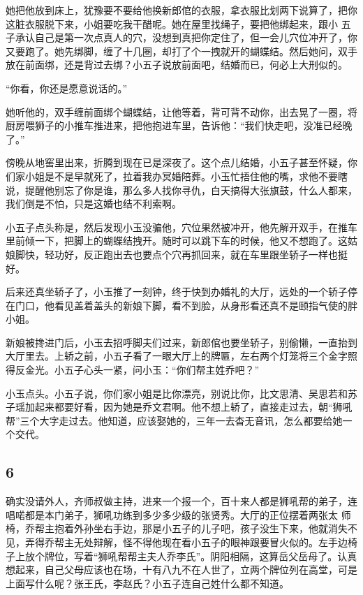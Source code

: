 她把他放到床上，犹豫要不要给他换新郎倌的衣服，拿衣服比划两下说算了，把你这脏衣服脱下来，小姐要吃我干醋呢。她在屋里找绳子，要把他绑起来，跟小
五子承认自己是第一次点真人的穴，没想到真把你定住了，但一会儿穴位冲开了，你又要跑了。她先绑脚，缠了十几圈，却打了个一拽就开的蝴蝶结。然后她问，双手放在前面绑，还是背过去绑？小五子说放前面吧，结婚而已，何必上大刑似的。

“你看，你还是愿意说话的。”

她听他的，双手缠前面绑个蝴蝶结，让他等着，背可背不动你，出去晃了一圈，将厨房喂狮子的小推车推进来，把他抱进车里，告诉他：“我们快走吧，没准已经晚了。”

傍晚从地窖里出来，折腾到现在已是深夜了。这个点儿结婚，小五子甚至怀疑，你们家小姐是不是早就死了，拉着我办冥婚陪葬。小玉忙捂住他的嘴，求他不要瞎说，提醒他别忘了你是谁，那么多人找你寻仇，白天搞得大张旗鼓，什么人都来，我们倒是不怕，只是这婚也结不利索啊。

小五子点头称是，然后发现小玉没骗他，穴位果然被冲开，他先解开双手，在推车里前倾一下，把脚上的蝴蝶结拽开。随时可以跳下车的时候，他又不想跑了。这姑娘脚快，轻功好，反正跑出去也要点个穴再抓回来，就在车里跟坐轿子一样也挺好。

后来还真坐轿子了，小玉推了一刻钟，终于快到办婚礼的大厅，远处的一个轿子停在门口，他看见盖着盖头的新娘下脚，看不到脸，从身形看还真不是颐指气使的胖小姐。

新娘被搀进门后，小玉去招呼脚夫们过来，新郎倌也要坐轿子，别偷懒，一直抬到大厅里去。上轿之前，小五子看了一眼大厅上的牌匾，左右两个灯笼将三个金字照得反金光。小五子心头一紧，问小玉：“你们帮主姓乔吧？”

小玉点头。小五子说，你们家小姐是比你漂亮，别说比你，比文思清、吴思若和苏子瑶加起来都要好看，因为她是乔文君啊。他不想上轿了，直接走过去，朝“狮吼帮”三个大字走过去。他知道，应该娶她的，三年一去杳无音讯，怎么都要给她一个交代。
\newline

{\centering\subsection{6}}

确实没请外人，齐师叔做主持，进来一个报一个，百十来人都是狮吼帮的弟子，连唱喏都是本门弟子，狮吼功练到多少多少级的张贤秀。大厅的正位摆着两张太
师椅，乔帮主抱着外孙坐右手边，那是小五子的儿子吧，孩子没生下来，他就消失不见，弄得乔帮主无处辩解，怪不得他现在看小五子的眼神跟要冒火似的。左手边椅子上放个牌位，写着“狮吼帮帮主夫人乔李氏”。阴阳相隔，这算岳父岳母了。认真想起来，自己父母应该也在场，十有八九不在人世了，立两个牌位列在高堂，可是上面写什么呢？张王氏，李赵氏？小五子连自己姓什么都不知道。

